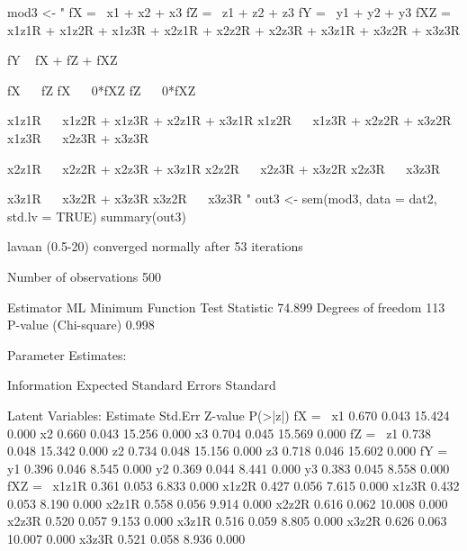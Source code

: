 \begin{Schunk}
\begin{Sinput}
 mod3 <- "
 fX =~ x1 + x2 + x3
 fZ =~ z1 + z2 + z3
 fY =~ y1 + y2 + y3
 fXZ =~ x1z1R + x1z2R + x1z3R +
 x2z1R + x2z2R + x2z3R +
 x3z1R + x3z2R + x3z3R
 
 fY ~ fX + fZ + fXZ
 
 fX ~~ fZ
 fX ~~ 0*fXZ
 fZ ~~ 0*fXZ
 
 x1z1R ~~ x1z2R + x1z3R + x2z1R + x3z1R
 x1z2R ~~ x1z3R + x2z2R + x3z2R
 x1z3R ~~ x2z3R + x3z3R
 
 x2z1R ~~ x2z2R + x2z3R + x3z1R
 x2z2R ~~ x2z3R + x3z2R
 x2z3R ~~ x3z3R
 
 x3z1R ~~ x3z2R + x3z3R
 x3z2R ~~ x3z3R
 "
 out3 <- sem(mod3, data = dat2, std.lv = TRUE)
 summary(out3)
\end{Sinput}
\begin{Soutput}
lavaan (0.5-20) converged normally after  53 iterations

  Number of observations                           500

  Estimator                                         ML
  Minimum Function Test Statistic               74.899
  Degrees of freedom                               113
  P-value (Chi-square)                           0.998

Parameter Estimates:

  Information                                 Expected
  Standard Errors                             Standard

Latent Variables:
                   Estimate  Std.Err  Z-value  P(>|z|)
  fX =~                                               
    x1                0.670    0.043   15.424    0.000
    x2                0.660    0.043   15.256    0.000
    x3                0.704    0.045   15.569    0.000
  fZ =~                                               
    z1                0.738    0.048   15.342    0.000
    z2                0.734    0.048   15.156    0.000
    z3                0.718    0.046   15.602    0.000
  fY =~                                               
    y1                0.396    0.046    8.545    0.000
    y2                0.369    0.044    8.441    0.000
    y3                0.383    0.045    8.558    0.000
  fXZ =~                                              
    x1z1R             0.361    0.053    6.833    0.000
    x1z2R             0.427    0.056    7.615    0.000
    x1z3R             0.432    0.053    8.190    0.000
    x2z1R             0.558    0.056    9.914    0.000
    x2z2R             0.616    0.062   10.008    0.000
    x2z3R             0.520    0.057    9.153    0.000
    x3z1R             0.516    0.059    8.805    0.000
    x3z2R             0.626    0.063   10.007    0.000
    x3z3R             0.521    0.058    8.936    0.000


\end{Soutput}
\end{Schunk}
